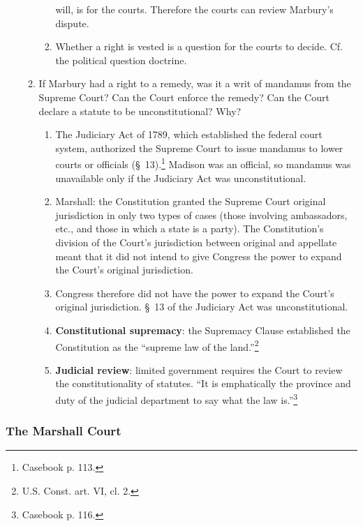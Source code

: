 \begin{enumerate}
\begin{enumerate}
\begin{enumerate}
            will, is for the courts. Therefore the courts can review Marbury's 
            dispute.
            \item Whether a right is vested is a question for the courts to 
            decide. Cf. the political question doctrine.
        \end{enumerate}
        \item If Marbury had a right to a remedy, was it a writ of mandamus 
        from the Supreme Court? Can the Court enforce the remedy? Can the 
        Court declare a statute to be unconstitutional? Why?
        \begin{enumerate}
            \item The Judiciary Act of 1789, which established the federal 
            court system, authorized the Supreme Court to issue mandamus to 
            lower courts or officials (\S\ 13).\footnote{Casebook p. 113.}
            Madison was an official, so mandamus was unavailable only if the 
            Judiciary Act was unconstitutional.
            \item Marshall: the Constitution granted the Supreme Court 
            original jurisdiction in only two types of cases (those involving 
            ambassadors, etc., and those in which a state is a party). The 
            Constitution's division of the Court's jurisdiction between 
            original and appellate meant that it did not intend to give 
            Congress the power to expand the Court's original jurisdiction.
            \item Congress therefore did not have the power to expand the 
            Court's original jurisdiction. \S\ 13 of the Judiciary Act was 
            unconstitutional.
            \item \textbf{Constitutional supremacy}: the Supremacy Clause 
            established the Constitution as the ``supreme law of the 
            land.''\footnote{U.S. Const. art. VI, cl. 2.}
            \item \textbf{Judicial review}: limited government requires the 
            Court to review the constitutionality of statutes. ``It is 
            emphatically the province and duty of the judicial department to 
            say what the law is.''\footnote{Casebook p. 116.}
        \end{enumerate}
    \end{enumerate}
\end{enumerate}

\subsubsection{The Marshall Court}

